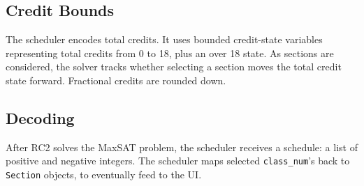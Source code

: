 \documentclass[11pt, a4paper]{article} %
\newcommand{\<}{\langle}
\renewcommand{\>}{\rangle}
\begin{document}
\subsection*{Credit Bounds}
The scheduler encodes total credits. It uses bounded credit-state variables representing total credits from 0 to 18, plus an over 18 state. As sections are considered, the solver tracks whether selecting a section moves the total credit state forward. Fractional credits are rounded down.
\newpage
\subsection*{Decoding}
After RC2 solves the MaxSAT problem, the scheduler receives a schedule: a list of positive and negative integers. The scheduler maps selected \texttt{class\_num}'s back to \texttt{Section} objects, to eventually feed to the UI.
\end{document}
